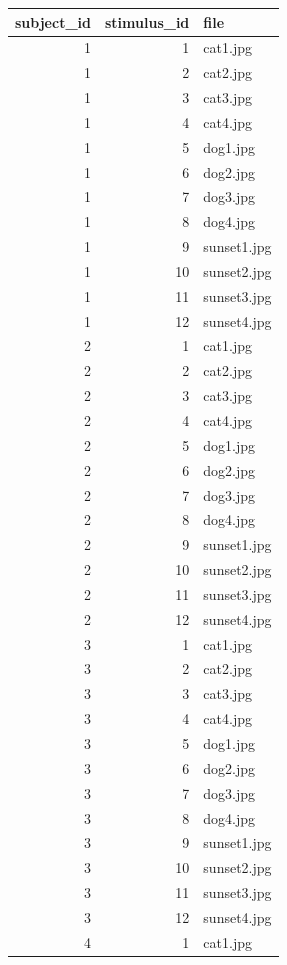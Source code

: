 \documentclass[
]{book}
\begin{document}
\begin{tabular}{r|r|l}
\hline
subject\_id & stimulus\_id & file\\
\hline
1 & 1 & cat1.jpg\\
\hline
1 & 2 & cat2.jpg\\
\hline
1 & 3 & cat3.jpg\\
\hline
1 & 4 & cat4.jpg\\
\hline
1 & 5 & dog1.jpg\\
\hline
1 & 6 & dog2.jpg\\
\hline
1 & 7 & dog3.jpg\\
\hline
1 & 8 & dog4.jpg\\
\hline
1 & 9 & sunset1.jpg\\
\hline
1 & 10 & sunset2.jpg\\
\hline
1 & 11 & sunset3.jpg\\
\hline
1 & 12 & sunset4.jpg\\
\hline
2 & 1 & cat1.jpg\\
\hline
2 & 2 & cat2.jpg\\
\hline
2 & 3 & cat3.jpg\\
\hline
2 & 4 & cat4.jpg\\
\hline
2 & 5 & dog1.jpg\\
\hline
2 & 6 & dog2.jpg\\
\hline
2 & 7 & dog3.jpg\\
\hline
2 & 8 & dog4.jpg\\
\hline
2 & 9 & sunset1.jpg\\
\hline
2 & 10 & sunset2.jpg\\
\hline
2 & 11 & sunset3.jpg\\
\hline
2 & 12 & sunset4.jpg\\
\hline
3 & 1 & cat1.jpg\\
\hline
3 & 2 & cat2.jpg\\
\hline
3 & 3 & cat3.jpg\\
\hline
3 & 4 & cat4.jpg\\
\hline
3 & 5 & dog1.jpg\\
\hline
3 & 6 & dog2.jpg\\
\hline
3 & 7 & dog3.jpg\\
\hline
3 & 8 & dog4.jpg\\
\hline
3 & 9 & sunset1.jpg\\
\hline
3 & 10 & sunset2.jpg\\
\hline
3 & 11 & sunset3.jpg\\
\hline
3 & 12 & sunset4.jpg\\
\hline
4 & 1 & cat1.jpg\\

\end{tabular}
\end{document}
